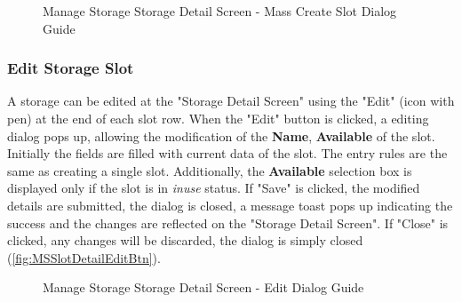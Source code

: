 \begin{figure}[htb!]
    \vspace{10pt}
    \caption{Manage Storage Storage Detail Screen - Mass Create Slot Dialog Guide}
	\label{fig:MSobjmassCreateSlotGuide}
\end{figure}


\subsubsection{Edit Storage Slot}
\label{subsubsec:editSlot}
A storage can be edited at the "Storage Detail Screen" using the "Edit" (icon with pen) at the end of each slot row. 
When the "Edit" button is clicked, a editing dialog pops up, allowing the modification of the \textbf{Name}, \textbf{Available} of the slot. Initially the fields are filled with current data of the slot. The entry rules are the same as creating a single slot. Additionally, the \textbf{Available} selection box is displayed only if the slot is in \textit{inuse} status.
If "Save" is clicked, the modified details are submitted, the dialog is closed, a message toast pops up indicating the success and the changes are reflected on the "Storage Detail Screen". If "Close" is clicked, any changes will be discarded, the dialog is simply closed (\autoref{fig:MSSlotDetailEditBtn}).

\begin{figure}[htb!]
	\centering
    \vspace{5pt}
    \hspace{5pt}
    \caption{Manage Storage Storage Detail Screen - Edit Dialog Guide}
	\label{fig:MSSlotDetailEditBtn}
\end{figure}

